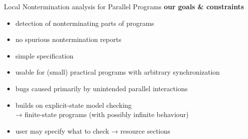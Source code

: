 \documentclass[aspectratio=169, fi]{paradise-slide}
\begin{document}
\begin{frame}[fragile]{Local Nontermination analysis for Parallel Programs}
  \textbf{our goals \& constraints}
  \begin{itemize}
    \item detection of nonterminating parts of programs
    \item no spurious nontermination reports
    \item simple specification
    \item usable for (small) practical programs with arbitrary synchronization
    \item bugs caused primarily by unintended parallel interactions
  \pause
  \bigskip
    \item builds on explicit-state model checking\\
      → finite-state programs (with possibly infinite behaviour)
    \item user may specify what to check → resource sections
  \end{itemize}

%
\end{frame}
\end{document}
